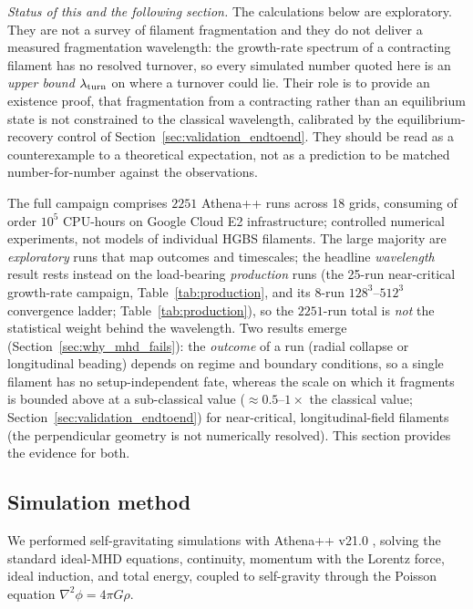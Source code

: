 \documentclass[usenatbib,twoside,twocolumn]{mnras}
\begin{document}
\noindent\emph{Status of this and the following section.} The calculations below are exploratory. They are not a survey of filament fragmentation and they do not deliver a measured fragmentation wavelength: the growth-rate spectrum of a contracting filament has no resolved turnover, so every simulated number quoted here is an \emph{upper bound} $\lambda_{\rm turn}$ on where a turnover could lie. Their role is to provide an existence proof, that fragmentation from a contracting rather than an equilibrium state is not constrained to the classical wavelength, calibrated by the equilibrium-recovery control of Section~\ref{sec:validation_endtoend}. They should be read as a counterexample to a theoretical expectation, not as a prediction to be matched number-for-number against the observations.

The full campaign comprises $2251$ Athena++ runs across 18 grids, consuming of order $10^5$ CPU-hours on Google Cloud E2 infrastructure; controlled numerical experiments, not models of individual HGBS filaments. The large majority are \emph{exploratory} runs that map outcomes and timescales; the headline \emph{wavelength} result rests instead on the load-bearing \emph{production} runs (the 25-run near-critical growth-rate campaign, Table~\ref{tab:production}, and its 8-run $128^3$--$512^3$ convergence ladder; Table~\ref{tab:production}), so the $2251$-run total is \emph{not} the statistical weight behind the wavelength. Two results emerge (Section~\ref{sec:why_mhd_fails}): the \emph{outcome} of a run (radial collapse or longitudinal beading) depends on regime and boundary conditions, so a single filament has no setup-independent fate, whereas the scale on which it fragments is bounded above at a sub-classical value ($\approx0.5$--$1\times$ the classical value; Section~\ref{sec:validation_endtoend}) for near-critical, longitudinal-field filaments (the perpendicular geometry is not numerically resolved). This section provides the evidence for both.

\subsection{Simulation method}

We performed self-gravitating simulations with Athena++ v21.0 \citep{Stone2020}, solving the standard ideal-MHD equations, continuity, momentum with the Lorentz force, ideal induction, and total energy, coupled to self-gravity through the Poisson equation $\nabla^2\phi=4\pi G\rho$.
\end{document}
